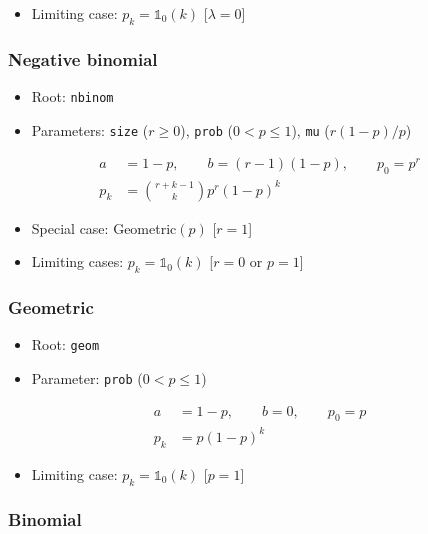\documentclass[x11names]{article}
\newcommand{\code}[1]{\texttt{#1}}
\begin{document}
\begin{itemize}
\item Limiting case: $p_k = \mathbb{1}_0(k)$ [$\lambda = 0$]
\end{itemize}

\subsubsection{Negative binomial}

\begin{itemize}
\item Root: \code{nbinom}
\item Parameters: \code{size} ($r \geq 0$),
  \code{prob} ($0 < p \leq 1$),
  \code{mu} ($r(1 - p)/p$)
\end{itemize}
\begin{align*}
  a &= 1 - p, \qquad b = (r - 1)(1 - p), \qquad p_0 = p^r \\
  p_k &= \binom{r+k-1}{k} p^r (1 - p)^k
\end{align*}

\begin{itemize}
\item Special case: Geometric$(p)$ [$r = 1$]
\item Limiting cases: $p_k = \mathbb{1}_0(k)$ [$r = 0$ or $p = 1$]
\end{itemize}

\subsubsection{Geometric}

\begin{itemize}
\item Root: \code{geom}
\item Parameter: \code{prob} ($0 < p \leq 1$)
\end{itemize}
\begin{align*}
  a &= 1 - p, \qquad b = 0, \qquad p_0 = p \\
  p_k &= p (1 - p)^k
\end{align*}

\begin{itemize}
\item Limiting case: $p_k = \mathbb{1}_0(k)$ [$p = 1$]
\end{itemize}

\subsubsection{Binomial}
\end{document}

